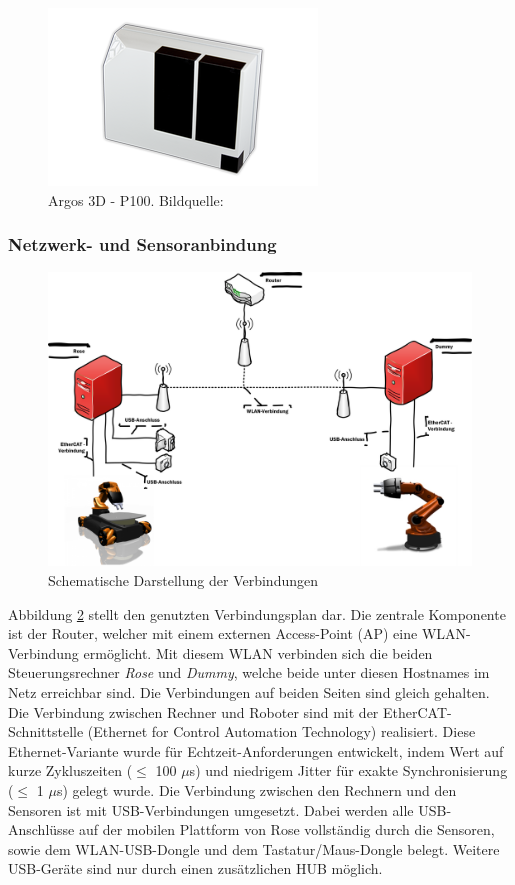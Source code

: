 \begin{figure}[H]
	\centering
	\includegraphics[scale=0.8]{fig/argos3d}   
	\caption[Argos 3D - P100]{Argos 3D - P100. Bildquelle: \cite{bluetechnix2015}}
	\label{fig:aufbau-argos3d}
\end{figure}

\subsubsection{Netzwerk- und Sensoranbindung}

\begin{figure}[H]
	\centering
	\includegraphics[scale=0.5]{fig/netw}   
	\caption[Schematische Darstellung der Verbindungen]{Schematische Darstellung der Verbindungen}
	\label{fig:aufbau-netw}
\end{figure}

Abbildung \ref{fig:aufbau-netw} stellt den genutzten Verbindungsplan dar. Die zentrale Komponente ist der Router, welcher mit einem externen Access-Point (AP) eine WLAN-Verbindung ermöglicht. Mit diesem WLAN verbinden sich die beiden Steuerungsrechner \textit{Rose} und \textit{Dummy}, welche beide unter diesen Hostnames im Netz erreichbar sind. Die Verbindungen auf beiden Seiten sind gleich gehalten. Die Verbindung zwischen Rechner und Roboter sind mit der EtherCAT-Schnittstelle (Ethernet for Control Automation Technology) realisiert. Diese Ethernet-Variante wurde für Echtzeit-Anforderungen entwickelt, indem Wert auf kurze Zykluszeiten ($\leq$ 100 $\mu$s) und  niedrigem Jitter für exakte Synchronisierung ($\leq$ 1 $\mu$s) gelegt wurde.\cite{ethercat} Die Verbindung zwischen den Rechnern und den Sensoren ist mit USB-Verbindungen umgesetzt. Dabei werden alle USB-Anschlüsse auf der mobilen Plattform von Rose vollständig durch die Sensoren, sowie dem WLAN-USB-Dongle und dem Tastatur/Maus-Dongle belegt. Weitere USB-Geräte sind nur durch einen zusätzlichen HUB möglich. 

